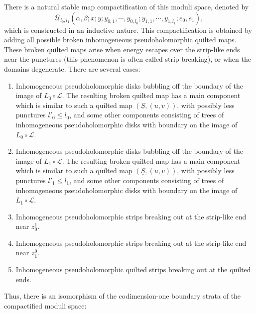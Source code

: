 \documentclass{amsart}
\numberwithin{equation}{section}
\numberwithin{figure}{section}
\begin{document}
	There is a natural stable map compactification of this moduli space, denoted by
\begin{equation}\label{moduli space of quilted maps for another realization of the correspondence functor}
\bar{\mathcal{U}}_{l_{0}, l_{1}}(\alpha, \beta; x; y; y_{0, 1}, \cdots, y_{0, l_{0}}; y_{1, 1}, \cdots, y_{1, l_{1}}; e_{0}, e_{1}),
\end{equation}
which is constructed in an inductive nature. This compactification is obtained by adding all possible broken inhomogeneous pseudoholomorphic quilted maps. These broken quilted maps arise when energy escapes over the strip-like ends near the punctures (this phenomenon is often called strip breaking), or when the domains degenerate. There are several cases:
\begin{enumerate}[label=(\roman*)]

\item Inhomogeneous pseudoholomorphic disks bubbling off the boundary of the image of $L_{0} \circ \mathcal{L}$. The resulting broken quilted map has a main component which is similar to such a quilted map $(\underline{S}, (u, v))$, with possibly less punctures $l'_{0} \le l_{0}$, and some other components consisting of trees of inhomogeneous pseudoholomorphic disks with boundary on the image of $L_{0} \circ \mathcal{L}$.

\item Inhomogeneous pseudoholomorphic disks bubbling off the boundary of the image of $L_{1} \circ \mathcal{L}$. The resulting broken quilted map has a main component which is similar to such a quilted map $(\underline{S}, (u, v))$, with possibly less punctures $l'_{1} \le l_{1}$, and some other components consisting of trees of inhomogeneous pseudoholomorphic disks with boundary on the image of $L_{1} \circ \mathcal{L}$.

\item Inhomogeneous pseudoholomorphic strips breaking out at the strip-like end near $z_{0}^{1}$.

\item Inhomogeneous pseudoholomorphic strips breaking out at the strip-like end near $z_{1}^{0}$.

\item Inhomogeneous pseudoholomorphic quilted strips breaking out at the quilted ends.

\end{enumerate}
Thus, there is an isomorphism of the codimension-one boundary strata of the compactified moduli space:
\end{document}
